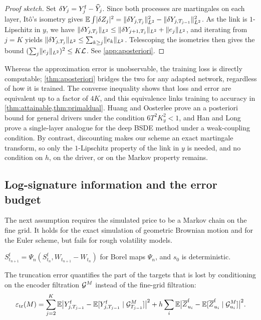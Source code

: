 \begin{proof}[Proof sketch]
Set $\delta Y_j=Y^{\mathrm f}_j-\widehat Y_j$. Since both processes are martingales on each layer, It\^o's isometry gives $\mathbb{E}\int\lvert \delta Z_j\rvert^2=\lVert \delta Y_{j,T_j}\rVert^2_{L^2}-\lVert \delta Y_{j,T_{j-1}}\rVert^2_{L^2}$. As the link is $1$-Lipschitz in $y$, we have $\lVert \delta Y_{j,T_j}\rVert_{L^2}\le\lVert \delta Y_{j+1,T_j}\rVert_{L^2}+\lVert e_j\rVert_{L^2}$, and iterating from $j=K$ yields $\lVert \delta Y_{j,T_j}\rVert_{L^2}\le\sum_{k\ge j}\lVert e_k\rVert_{L^2}$. Telescoping the isometries then gives the bound $(\sum_j\lVert e_j\rVert_{L^2})^2\le K\mathcal{L}$. See \cref{app:aposteriori}.
\end{proof}

\begin{remark}\label{rem:aposteriori}
Whereas the approximation error is unobservable, the training loss is directly computable; \cref{thm:aposteriori} bridges the two for any adapted network, regardless of how it is trained. The converse inequality shows that loss and error are equivalent up to a factor of $4K$, and this equivalence links training to accuracy in \cref{thm:attainable,thm:primaldual}. Huang and Oosterlee \cite[Thm.~3.4]{huang2026} prove an a posteriori bound for general drivers under the condition $6T^2K_y^2<1$, and Han and Long \cite{han2020convergence} prove a single-layer analogue for the deep BSDE method under a weak-coupling condition. By contrast, discounting makes our scheme an exact martingale transform, so only the $1$-Lipschitz property of the link in $y$ is needed, and no condition on $h$, on the driver, or on the Markov property remains.
\end{remark}

\subsection{Log-signature information and the error budget}\label{sec:info}

The next assumption requires the simulated price to be a Markov chain on the fine grid. It holds for the exact simulation of geometric Brownian motion and for the Euler scheme, but fails for rough volatility models.

\begin{assumption}\label{ass:obs}
$S^{\mathrm f}_{t_{n+1}}=\Psi_n(S^{\mathrm f}_{t_n},W_{t_{n+1}}-W_{t_n})$ for Borel maps $\Psi_n$, and $s_0$ is deterministic.
\end{assumption}

The truncation error quantifies the part of the targets that is lost by conditioning on the encoder filtration $\mathcal{G}^M$ instead of the fine-grid filtration:
\[
\varepsilon_{\mathrm{tr}}(M)=\sum_{j=2}^K\mathbb{E}\bigl\lvert Y^{\mathrm f}_{j,T_{j-1}}-\mathbb{E}[Y^{\mathrm f}_{j,T_{j-1}}\mid\mathcal{G}^{M}_{T_{j-1}}]\bigr\rvert^2+h\sum_i\mathbb{E}\bigl\lvert\overline Z^{\mathrm f}_{u_i}-\mathbb{E}[\overline Z^{\mathrm f}_{u_i}\mid\mathcal{G}^{M}_{u_i}]\bigr\rvert^2 .
\]

